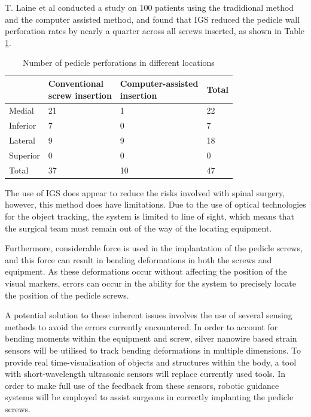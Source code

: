 \documentclass[conference, a4paper]{IEEEtran}
\begin{document}
T. Laine et al conducted a study on 100 patients using the tradidional method and the 
computer assisted method, and found that IGS reduced the pedicle wall perforation rates by 
nearly a quarter across all screws inserted, as shown in Table \ref{tab:accuracy}\cite{Laine2000}.
\begin{table}[h!]
	\centering
	\begin{tabular}{l l l l }
		& \shortstack{Conventional\\screw insertion} & \shortstack{Computer-assisted\\insertion} & Total \\ \hline
		Medial & 21 & 1 & 22 \\ \hline
		Inferior & 7 & 0 & 7 \\ \hline
		Lateral & 9 & 9 & 18 \\ \hline
		Superior & 0 & 0 & 0 \\ \hline
		Total & 37 &10 & 47 \\
	\end{tabular}
	\caption{Number of pedicle perforations in different locations\cite{Laine2000}}
	\label{tab:accuracy}
\end{table}

The use of IGS does appear to reduce the risks involved with spinal surgery, 
however, this method does have limitations. Due to the use of optical technologies for the object tracking, the
system is limited to line of sight, which means that the surgical team must remain out of the way of the locating
equipment. 

Furthermore, considerable force is used in the implantation of the pedicle screws, and this force can
result in bending deformations in both the screws and equipment\cite{Chatzistergos2010}. As these deformations occur without
affecting the position of the visual markers, errors can occur in the ability for the system to precisely locate the
position of the pedicle screws\cite{Castro1996}.


A potential solution to these inherent issues involves the use of several sensing methods to avoid the errors
currently encountered. In order to account for bending moments within the equipment and screw, silver
nanowire based strain sensors will be utilised to track bending deformations in multiple dimensions. To provide
real time-visualisation of objects and structures within the body, a tool with short-wavelength ultrasonic sensors will
replace currently used tools. In order to make full use of the feedback from these sensors, robotic guidance
systems will be employed to assist surgeons in correctly implanting the pedicle screws. 
\end{document}
